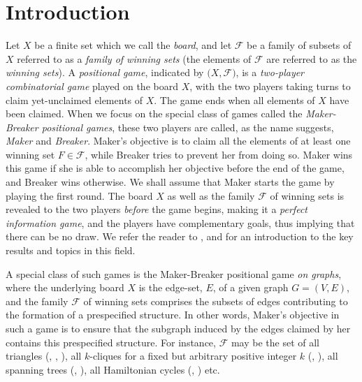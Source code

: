 \documentclass{article}
\theoremstyle{definition}
\theoremstyle{plain}
\theoremstyle{remark}
\theoremstyle{definition}
\begin{document}
\section{Introduction}

Let $X$ be a finite set which we call the \emph{board}, and let $\mathcal{F}$ be a family of subsets of $X$ referred to as a \emph{family of winning sets} (the elements of $\mathcal{F}$ are referred to as the \emph{winning sets}).  A \emph{positional game}, indicated by $(X,\mathcal{F)}$, is a \emph{two-player combinatorial game} played on the board $X$, with the two players taking turns to claim yet-unclaimed elements of $X$. The game ends when all elements of $X$ have been claimed. When we focus on the special class of games called the \emph{Maker-Breaker positional games}, these two players are called, as the name suggests, \emph{Maker} and \emph{Breaker}. Maker's objective is to claim all the elements of at least one winning set $F \in \mathcal{F}$, while Breaker tries to prevent her from doing so. Maker wins this game if she is able to accomplish her objective before the end of the game, and Breaker wins otherwise. We shall assume that Maker starts the game by playing the first round. The board $X$ as well as the family $\mathcal{F}$ of winning sets is revealed to the two players \emph{before} the game begins, making it a \emph{perfect information game}, and the players have complementary goals, thus implying that there can be no draw. We refer the reader to \cite{beck2008combinatorial},\cite{Hefetz2014-mg} and \cite{krivelevich2014positional} for an introduction to the key results and topics in this field.

A special class of such games is the Maker-Breaker positional game \emph{on graphs}, where the underlying board $X$ is the edge-set, $E$, of a given graph $G=(V,E)$, and the family $\mathcal{F}$ of winning sets comprises the subsets of edges contributing to the formation of a prespecified structure. In other words, Maker's objective in such a game is to ensure that the subgraph induced by the edges claimed by her contains this prespecified structure. For instance, $\mathcal{F}$ may be the set of all triangles (\cite{chvatal1978biased}, \cite{balogh2011chvatal}, \cite{glazik2022new}), all $k$-cliques for a fixed but arbitrary positive integer $k$ (\cite{beck2008combinatorial}, \cite{bednarska2000biased}), all spanning trees (\cite{chvatal1978biased}, \cite{beck1982remarks}), all Hamiltonian cycles (\cite{beck1985random}, \cite{krivelevich2011critical}) etc. 
\end{document}
